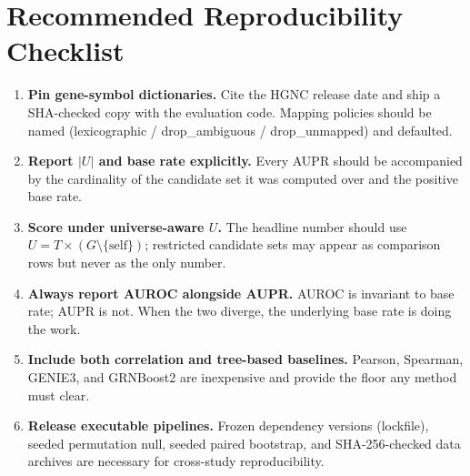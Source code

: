 \documentclass[sigconf]{acmart}
\begin{document}
\section{Recommended Reproducibility Checklist}
\label{sec:recs}

\begin{enumerate}
\item \textbf{Pin gene-symbol dictionaries.} Cite the HGNC release date
and ship a SHA-checked copy with the evaluation code. Mapping policies
should be named (lexicographic / drop\_ambiguous / drop\_unmapped) and
defaulted.
\item \textbf{Report $|U|$ and base rate explicitly.} Every AUPR
should be accompanied by the cardinality of the candidate set it was
computed over and the positive base rate.
\item \textbf{Score under universe-aware $U$.} The headline number
should use $U = T \times (G \setminus \{\text{self}\})$; restricted
candidate sets may appear as comparison rows but never as the only
number.
\item \textbf{Always report AUROC alongside AUPR.} AUROC is invariant
to base rate; AUPR is not. When the two diverge, the underlying base
rate is doing the work.
\item \textbf{Include both correlation and tree-based baselines.}
Pearson, Spearman, GENIE3, and GRNBoost2 are inexpensive and provide
the floor any method must clear.
\item \textbf{Release executable pipelines.} Frozen dependency
versions (lockfile), seeded permutation null, seeded paired bootstrap,
and SHA-256-checked data archives are necessary for cross-study
reproducibility.
\end{enumerate}
\end{document}
